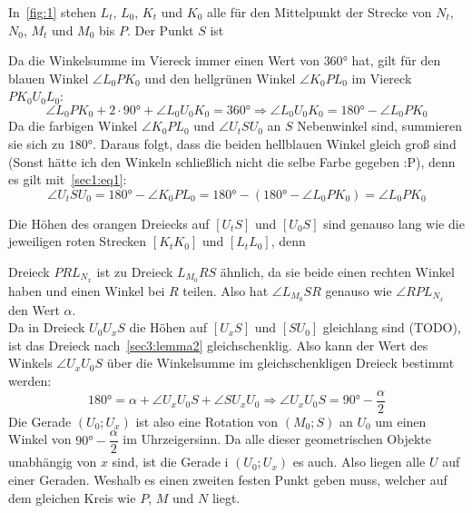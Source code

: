 \documentclass[10pt, a4paper]{amsart}
\makeatletter
\renewenvironment{proof}[1][\proofname]{\par
\pushQED{\qed}%
\normalfont \topsep6\p@\@plus6\p@\relax
\trivlist
\item\relax
{\bfseries#1}\hspace\labelsep\ignorespaces
}{%
\popQED\endtrivlist\@endpefalse
}
\makeatother
\begin{document}
\begin{proof}
\begin{figure}[h]
    \caption{}
    \label{fig:1} 
  \end{figure}
  In~\autoref{fig:1} stehen $L_t$, $L_0$, $K_t$ und $K_0$ alle für den
  Mittelpunkt der Strecke von $N_t$, $N_0$, $M_t$ und $M_0$ bis $P$. Der Punkt
  $S$ ist 
  
  Da die Winkelsumme im Viereck immer einen Wert von $360°$ hat, gilt für den
  blauen Winkel $\angle L_0PK_0$ und den hellgrünen Winkel $\angle K_0PL_0$ im Viereck $ PK_0U_0L_0 $:
  \begin{equation}
    \label{sec1:eq1}
    \angle L_0PK_0 + 2\cdot 90° + \angle L_0U_0K_0 = 360°\Rightarrow \angle L_0U_0K_0 = 180° - \angle L_0PK_0
  \end{equation}
  Da die farbigen Winkel $ \angle K_0PL_0 $ und $ \angle U_tSU_0 $ an $S$
  Nebenwinkel sind, summieren sie sich zu $180°$. Daraus folgt, dass die beiden
  hellblauen Winkel gleich groß sind (Sonst hätte ich den Winkeln schließlich
  nicht die selbe Farbe gegeben :P), denn es gilt mit~\eqref{sec1:eq1}:
  \begin{equation*}
    \angle U_tSU_0 = 180° - \angle K_0PL_0 = 180° - (180° - \angle L_0PK_0) = \angle L_0PK_0
  \end{equation*}
  
  Die Höhen des orangen Dreiecks auf $[U_tS]$ und $[U_0S]$ sind genauso lang wie
  die jeweiligen roten Strecken $[K_tK_0]$ und $[L_tL_0]$, denn


  
  Dreieck $PRL_{N_{x}}$ ist zu Dreieck $L_{M_0}RS$ ähnlich, da sie beide einen
  rechten Winkel haben und einen Winkel bei $R$ teilen. Also hat $\angle
  L_{M_0}SR$ genauso wie $\angle RPL_{N_x}$ den Wert $α$.\\
  Da in Dreieck $U_0U_xS$ die Höhen auf $[U_xS]$ und $[SU_0]$ gleichlang sind
  (TODO), ist das Dreieck nach~\autoref{sec3:lemma2} gleichschenklig. Also kann
  der Wert des Winkels $\angle U_xU_0S$ über die Winkelsumme im
  gleichschenkligen Dreieck bestimmt werden:
  \[180° = α + \angle U_xU_0S + \angle SU_xU_0 \Rightarrow \angle U_xU_0S =
    90°-\dfrac{α}{2} \] Die Gerade $(U_0;U_x)$ ist also eine Rotation von
  $(M_0;S)$ an $U_0$ um einen Winkel von $90°-\dfrac{α}{2}$ im Uhrzeigersinn. Da
  alle dieser geometrischen Objekte unabhängig von $x$ sind, ist die Gerade
i  $(U_0;U_x)$ es auch. Also liegen alle $U$ auf einer Geraden. Weshalb es einen
  zweiten festen Punkt geben muss, welcher auf dem gleichen Kreis wie $P$, $M$
  und $N$ liegt.
\end{proof}
\end{document}
